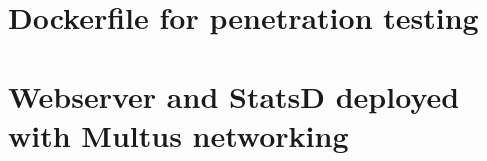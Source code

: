 \documentclass[english, 12pt, a4paper, sci, utf8, a-2b, online]{aaltothesis}
\begin{document}


\clearpage





\clearpage

\section{Dockerfile for penetration testing} \label{app:iptables-injector}



\clearpage

\section{Webserver and StatsD deployed with Multus networking} \label{app:multus-sidecar}



\clearpage



\clearpage


\end{document}
